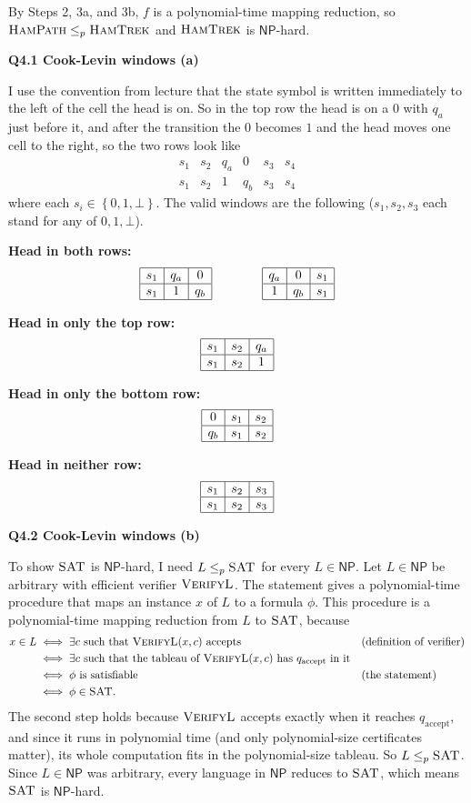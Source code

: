 \documentclass[11pt]{article}
\newcommand{\set}[1]{\left\{#1\right\}}
\newcommand{\lp}{\leq_p}
\newcommand{\cproblem}[1]{\textsc{#1}}
\newcommand{\NP}{\textsf{NP}}
\newcommand{\SAT}{\cproblem{SAT}}
\newcommand{\HP}{\cproblem{HamPath}}
\newcommand{\HT}{\cproblem{HamTrek}}
\newcommand{\qa}{q_a}
\newcommand{\qb}{q_b}
\newcommand{\win}[6]{\begin{array}{|c|c|c|}\hline #1 & #2 & #3 \\ \hline #4 & #5 & #6 \\ \hline\end{array}}
\newcommand{\qpage}[1]{\clearpage\noindent\textbf{\large #1}\par\medskip}
\begin{document}
By Steps 2, 3a, and 3b, $f$ is a polynomial-time mapping reduction, so $\HP \lp \HT$ and $\HT$ is $\NP$-hard.

\qpage{Q4.1 Cook-Levin windows (a)}

I use the convention from lecture that the state symbol is written immediately to the left of the cell the head is on.
So in the top row the head is on a $0$ with $\qa$ just before it, and after the transition the $0$ becomes $1$ and the head moves one cell to the right, so the two rows look like
\[
  \begin{array}{cccccc}
    s_1 & s_2 & \qa & 0   & s_3 & s_4 \\
    s_1 & s_2 & 1   & \qb & s_3 & s_4
  \end{array}
\]
where each $s_i \in \set{0, 1, \bot}$.
The valid windows are the following ($s_1, s_2, s_3$ each stand for any of $0, 1, \bot$).

\medskip
\textbf{Head in both rows:}
\[
  \win{s_1}{\qa}{0}{s_1}{1}{\qb}
  \qquad\qquad
  \win{\qa}{0}{s_1}{1}{\qb}{s_1}
\]

\textbf{Head in only the top row:}
\[
  \win{s_1}{s_2}{\qa}{s_1}{s_2}{1}
\]

\textbf{Head in only the bottom row:}
\[
  \win{0}{s_1}{s_2}{\qb}{s_1}{s_2}
\]

\textbf{Head in neither row:}
\[
  \win{s_1}{s_2}{s_3}{s_1}{s_2}{s_3}
\]

\qpage{Q4.2 Cook-Levin windows (b)}

To show $\SAT$ is $\NP$-hard, I need $L \lp \SAT$ for every $L \in \NP$.
Let $L \in \NP$ be arbitrary with efficient verifier $\textsc{VerifyL}$.
The statement gives a polynomial-time procedure that maps an instance $x$ of $L$ to a formula $\phi$.
This procedure is a polynomial-time mapping reduction from $L$ to $\SAT$, because
\begin{align*}
  x \in L
  &\iff \exists c \text{ such that } \textsc{VerifyL}(x, c) \text{ accepts} && \text{(definition of verifier)} \\
  &\iff \exists c \text{ such that the tableau of } \textsc{VerifyL}(x, c) \text{ has } q_{\text{accept}} \text{ in it} \\
  &\iff \phi \text{ is satisfiable} && \text{(the statement)} \\
  &\iff \phi \in \SAT.
\end{align*}
The second step holds because $\textsc{VerifyL}$ accepts exactly when it reaches $q_{\text{accept}}$, and since it runs in polynomial time (and only polynomial-size certificates matter), its whole computation fits in the polynomial-size tableau.
So $L \lp \SAT$.
Since $L \in \NP$ was arbitrary, every language in $\NP$ reduces to $\SAT$, which means $\SAT$ is $\NP$-hard.
\end{document}
